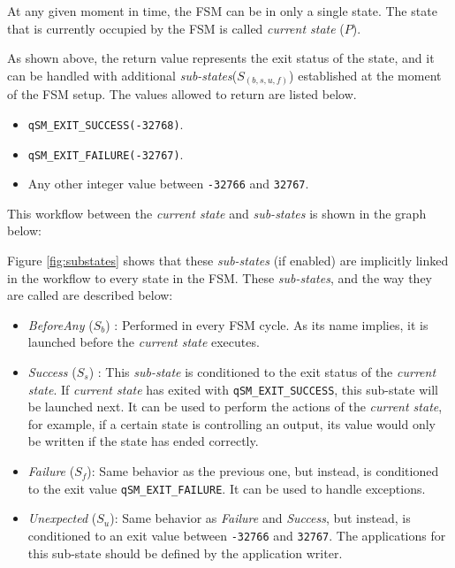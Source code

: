 At any given moment in time, the FSM can be in only a single state. The state that is currently occupied by the FSM is called \textit{current state} ($P$).

As shown above, the return value represents the exit status of the state, and it can be handled with additional \textit{sub-states}($S_{(b,s,u,f)}$) established at the moment of the FSM setup. The values allowed to return are listed below.

\begin{itemize}
    \item \lstinline{qSM_EXIT_SUCCESS(-32768)}.
    \item \lstinline{qSM_EXIT_FAILURE(-32767)}.
    \item Any other integer value between \lstinline{-32766} and \lstinline{32767}.
\end{itemize} 

This workflow between the \textit{current state} and \textit{sub-states} is shown in the graph below: 


Figure \ref{fig:substates} shows that these \textit{sub-states} (if enabled) are implicitly linked in the workflow to every state in the FSM. These \textit{sub-states}, and the way they are called are described below:

\begin{itemize}
    \item \textit{BeforeAny} ($S_b$) : Performed in every FSM cycle. As its name implies, it is launched before the \textit{current state} executes. 
    
    \item \textit{Success} ($S_s$) : This \textit{sub-state} is conditioned to the exit status of the \textit{current state}. If \textit{current state} has exited with  \lstinline{qSM_EXIT_SUCCESS}, this sub-state will be launched next. It can be used to perform the actions of the \textit{current state}, for example, if a certain state is controlling an output, its value would only be written if the state has ended correctly.
    
    \item \textit{Failure} ($S_f$): Same behavior as the previous one, but instead, is conditioned to the exit value \lstinline{qSM_EXIT_FAILURE}. It can be used to handle exceptions.
    
    \item \textit{Unexpected} ($S_u$): Same behavior as \textit{Failure} and \textit{Success}, but instead, is conditioned to an exit value between \lstinline{-32766} and \lstinline{32767}. The applications for this sub-state should be defined by the application writer.
\end{itemize}


